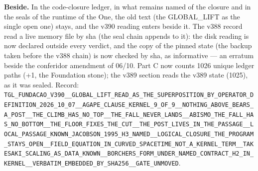 \documentclass[11pt]{article}
\theoremstyle{definition}\newtheorem{deriv}{Derivation}
\begin{document}
\textbf{Beside.} In the code-closure ledger, in what remains named of the closure and in the seals of the runtime of the One, the old text (the GLOBAL\_LIFT as the single open one) stays, and the v390 reading enters beside it. The v388 record read a live memory file by sha (the seal chain appends to it): the disk reading is now declared outside every verdict, and the copy of the pinned state (the backup taken before the v388 chain) is now checked by sha, as informative --- an erratum beside the conferidor amendment of 06/10. Part C now counts 1026 unique ledger paths (+1, the Foundation stone); the v389 section reads the v389 state (1025), as it was sealed. Record: \texttt{TGL\_\allowbreak{}FUNDACAO\_\allowbreak{}V390\_\allowbreak{}\_\allowbreak{}GLOBAL\_\allowbreak{}LIFT\_\allowbreak{}READ\_\allowbreak{}AS\_\allowbreak{}THE\_\allowbreak{}SUPERPOSITION\_\allowbreak{}BY\_\allowbreak{}OPERATOR\_\allowbreak{}DEFINITION\_\allowbreak{}2026\_\allowbreak{}10\_\allowbreak{}07\_\allowbreak{}\_\allowbreak{}AGAPE\_\allowbreak{}CLAUSE\_\allowbreak{}KERNEL\_\allowbreak{}9\_\allowbreak{}OF\_\allowbreak{}9\_\allowbreak{}\_\allowbreak{}NOTHING\_\allowbreak{}ABOVE\_\allowbreak{}BEARS\_\allowbreak{}A\_\allowbreak{}POST\_\allowbreak{}\_\allowbreak{}THE\_\allowbreak{}CLIMB\_\allowbreak{}HAS\_\allowbreak{}NO\_\allowbreak{}TOP\_\allowbreak{}\_\allowbreak{}THE\_\allowbreak{}FALL\_\allowbreak{}NEVER\_\allowbreak{}LANDS\_\allowbreak{}\_\allowbreak{}ABISMO\_\allowbreak{}THE\_\allowbreak{}FALL\_\allowbreak{}HAS\_\allowbreak{}NO\_\allowbreak{}BOTTOM\_\allowbreak{}\_\allowbreak{}THE\_\allowbreak{}FLOOR\_\allowbreak{}FIXES\_\allowbreak{}THE\_\allowbreak{}CUT\_\allowbreak{}\_\allowbreak{}THE\_\allowbreak{}POST\_\allowbreak{}LIVES\_\allowbreak{}IN\_\allowbreak{}THE\_\allowbreak{}PASSAGE\_\allowbreak{}\_\allowbreak{}LOCAL\_\allowbreak{}PASSAGE\_\allowbreak{}KNOWN\_\allowbreak{}JACOBSON\_\allowbreak{}1995\_\allowbreak{}H3\_\allowbreak{}NAMED\_\allowbreak{}\_\allowbreak{}LOGICAL\_\allowbreak{}CLOSURE\_\allowbreak{}THE\_\allowbreak{}PROGRAM\_\allowbreak{}STAYS\_\allowbreak{}OPEN\_\allowbreak{}\_\allowbreak{}FIELD\_\allowbreak{}EQUATION\_\allowbreak{}IN\_\allowbreak{}CURVED\_\allowbreak{}SPACETIME\_\allowbreak{}NOT\_\allowbreak{}A\_\allowbreak{}KERNEL\_\allowbreak{}TERM\_\allowbreak{}\_\allowbreak{}TAKESAKI\_\allowbreak{}SCALING\_\allowbreak{}AS\_\allowbreak{}DATA\_\allowbreak{}KNOWN\_\allowbreak{}\_\allowbreak{}BORCHERS\_\allowbreak{}FORM\_\allowbreak{}UNDER\_\allowbreak{}NAMED\_\allowbreak{}CONTRACT\_\allowbreak{}H2\_\allowbreak{}IN\_\allowbreak{}KERNEL\_\allowbreak{}\_\allowbreak{}VERBATIM\_\allowbreak{}EMBEDDED\_\allowbreak{}BY\_\allowbreak{}SHA256\_\allowbreak{}\_\allowbreak{}GATE\_\allowbreak{}UNMOVED}.
\end{document}
